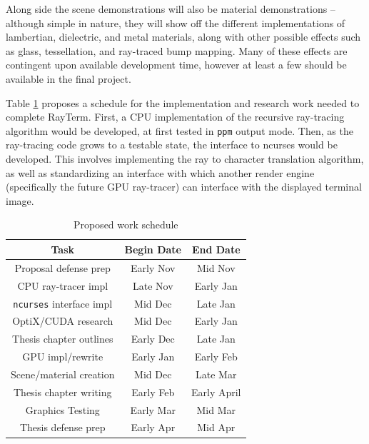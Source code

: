 \documentclass[11pt]{article}
\def\widow#1{\vskip #1\vbadness10000\penalty-200\vskip-#1}
\def\littlesection#1{
  \widow{2cm}
  \vskip 0.5cm
  \noindent{\bf #1}
  \vskip 0.0001cm
}
\newcommand{\name}{{\sc RayTerm}}
\begin{document}
Along side the scene demonstrations will also be material demonstrations -- although simple in nature, they will show off the different implementations of lambertian, dielectric, and metal materials, along with other possible effects such as glass, tessellation, and ray-traced bump mapping.
Many of these effects are contingent upon available development time, however at least a few should be available in the final project.

\littlesection{Development Schedule}
\label{sec:schedule}


Table \ref{worktable} proposes a schedule for the implementation and research work needed to complete \name.
First, a CPU implementation of the recursive ray-tracing algorithm would be developed, at first tested in \texttt{ppm} output mode.
Then, as the ray-tracing code grows to a testable state, the interface to ncurses would be developed.
This involves implementing the ray to character translation algorithm, as well as standardizing an interface with which another render engine (specifically the future GPU ray-tracer) can interface with the displayed terminal image.

\begin{table}[htb]
  \vspace*{0.6em}
  \centering
  \begin{tabular}{|c||c|c|}
    \hline
    \textbf{Task} & \textbf{Begin Date} & \textbf{End Date} \\\hline\hline
    Proposal defense prep & Early Nov & Mid Nov \\\hline
    CPU ray-tracer impl & Late Nov & Early Jan \\\hline
    \texttt{ncurses} interface impl & Mid Dec & Late Jan \\\hline
    OptiX/CUDA research & Mid Dec & Early Jan \\\hline
    Thesis chapter outlines & Early Dec & Late Jan \\\hline
    GPU impl/rewrite & Early Jan & Early Feb \\\hline
    Scene/material creation & Mid Dec & Late Mar \\\hline
    Thesis chapter writing & Early Feb & Early April \\\hline
    Graphics Testing & Early Mar & Mid Mar \\\hline
    Thesis defense prep & Early Apr & Mid Apr \\\hline
  \end{tabular}
  \caption{Proposed work schedule}
  \label{worktable}
\end{table}
\end{document}
